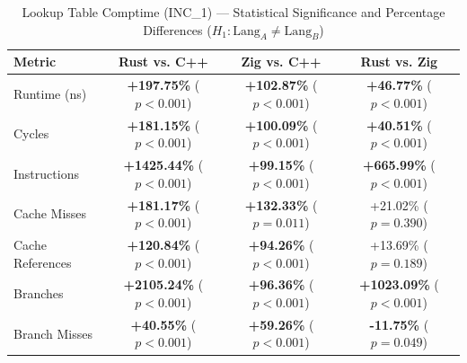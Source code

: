\begin{table}[htbp]
\centering
\caption{Lookup Table Comptime (INC_1) --- Statistical Significance and Percentage Differences ($H_1: \text{Lang}_A \neq \text{Lang}_B$)}
\label{tab:lut_comptime_1}
\begin{tabular}{l ccc}
\toprule
\textbf{Metric} & \textbf{Rust vs. C++} & \textbf{Zig vs. C++} & \textbf{Rust vs. Zig} \\
\midrule
Runtime (ns) & \textbf{+197.75\%} ($p < 0.001$) & \textbf{+102.87\%} ($p < 0.001$) & \textbf{+46.77\%} ($p < 0.001$) \\
Cycles & \textbf{+181.15\%} ($p < 0.001$) & \textbf{+100.09\%} ($p < 0.001$) & \textbf{+40.51\%} ($p < 0.001$) \\
Instructions & \textbf{+1425.44\%} ($p < 0.001$) & \textbf{+99.15\%} ($p < 0.001$) & \textbf{+665.99\%} ($p < 0.001$) \\
Cache Misses & \textbf{+181.17\%} ($p < 0.001$) & \textbf{+132.33\%} ($p = 0.011$) & +21.02\% ($p = 0.390$) \\
Cache References & \textbf{+120.84\%} ($p < 0.001$) & \textbf{+94.26\%} ($p < 0.001$) & +13.69\% ($p = 0.189$) \\
Branches & \textbf{+2105.24\%} ($p < 0.001$) & \textbf{+96.36\%} ($p < 0.001$) & \textbf{+1023.09\%} ($p < 0.001$) \\
Branch Misses & \textbf{+40.55\%} ($p < 0.001$) & \textbf{+59.26\%} ($p < 0.001$) & \textbf{-11.75\%} ($p = 0.049$) \\
\bottomrule
\end{tabular}
\end{table}


